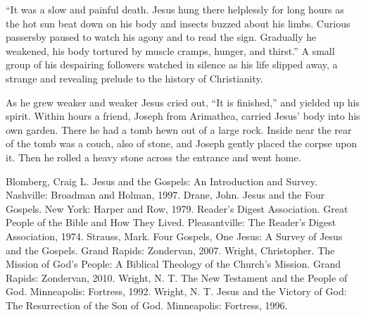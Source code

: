 “It was a slow and painful death. Jesus hung there helplessly for long hours as the hot sun beat
down on his body and insects buzzed about his limbs. Curious passersby paused to watch his agony and
to read the sign. Gradually he weakened, his body tortured by muscle cramps, hunger, and thirst.” A
small group of his despairing followers watched in silence as his life slipped away, a strange and
revealing prelude to the history of Christianity.

As he grew weaker and weaker Jesus cried out, “It is finished,” and yielded up his spirit. Within
hours a friend, Joseph from Arimathea, carried Jesus’ body into his own garden. There he had a tomb
hewn out of a large rock. Inside near the rear of the tomb was a couch, also of stone, and Joseph
gently placed the corpse upon it. Then he rolled a heavy stone across the entrance and went home.

\begin{readinglist}
\entry Blomberg, Craig L. Jesus and the Gospels: An Introduction and Survey. Nashville: Broadman and
  Holman, 1997.
\entry Drane, John. Jesus and the Four Gospels. New York: Harper and Row, 1979.
\entry Reader’s Digest Association. Great People of the Bible and How They Lived. Pleasantville: The
  Reader’s Digest Association, 1974.
\entry *Strauss, Mark. Four Gospels, One Jesus: A Survey of Jesus and the Gospels. Grand Rapids:
  Zondervan, 2007.
\entry *Wright, Christopher. The Mission of God’s People: A Biblical Theology of the Church’s
  Mission. Grand Rapids: Zondervan, 2010.
\entry Wright, N. T. The New Testament and the People of God. Minneapolis: Fortress, 1992.
\entry Wright, N. T. Jesus and the Victory of God: The Resurrection of the Son of God. Minneapolis:
  Fortress, 1996.
\end{readinglist}
